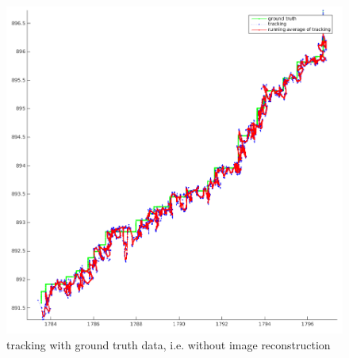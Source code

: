 \begin{figure}
\includegraphics[width=\columnwidth]{images/tracking_without_reconstruction.png}
\caption{tracking with ground truth data, i.e. without image reconstruction}
\label{fig:tracking_groundtruth}
\end{figure}
